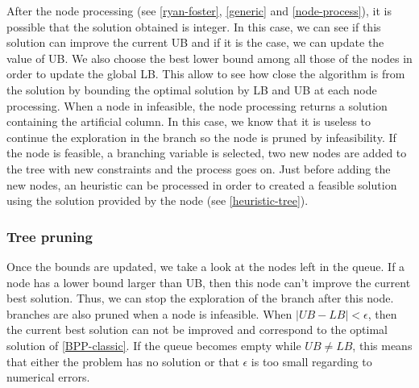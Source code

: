 After the node processing (see \ref{ryan-foster}, \ref{generic} and \ref{node-process}), it is possible that the solution obtained is integer. In this case, we can see if this solution can improve the current UB and if it is the case, we can update the value of UB. We also choose the best lower bound among all those of the nodes in order to update the global LB. This allow to see how close the algorithm is from the solution by bounding the optimal solution by LB and UB at each node processing. When a node in infeasible, the node processing returns a solution containing the artificial column. In this case, we know that it is useless to continue the exploration in the branch so the node is pruned by infeasibility. If the node is feasible, a branching variable is selected, two new nodes are added to the tree with new constraints and the process goes on. Just before adding the new nodes, an heuristic can be processed in order to created a feasible solution using the solution provided by the node (see \ref{heuristic-tree}).

\subsubsection{Tree pruning}

Once the bounds are updated, we take a look at the nodes left in the queue. If a node has a lower bound larger than UB, then this node can't improve the current best solution. Thus, we can stop the exploration of the branch after this node. branches are also pruned when a node is infeasible. When $|UB - LB| < \epsilon$, then the current best solution can not be improved and correspond to the optimal solution of \eqref{BPP-classic}. If the queue becomes empty while $UB \neq LB$, this means that either the problem has no solution or that $\epsilon$ is too small regarding to numerical errors.
